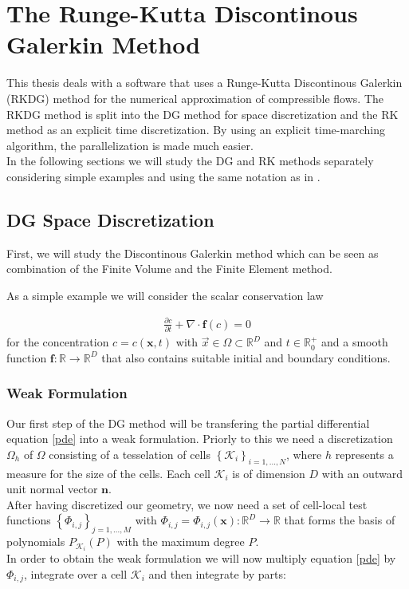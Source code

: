 \chapter{The Runge-Kutta Discontinous Galerkin Method}
\label{rkdgm}
	This thesis deals with a software that uses a Runge-Kutta Discontinous Galerkin (RKDG) method for the numerical approximation of compressible flows. The RKDG method is split into the DG method for space discretization and the RK method as an explicit time discretization. By using an explicit time-marching algorithm, the parallelization is made much easier. \\ \indent
	In the following sections we will study the DG and RK methods separately considering simple examples and using the same notation as in \cite{mueller2014}.
	\section{DG Space Discretization}
		First, we will study the Discontinous Galerkin method which can be seen as combination of the Finite Volume and the Finite Element method.

		As a simple example we will consider the scalar conservation law 
		
		\begin{align}
			\frac{\partial c}{\partial t} + \nabla \cdot \boldsymbol{f}(c) = 0
			\label{pde}
		\end{align}	
		for the concentration $c = c(\boldsymbol{x}, t)$  with $\vec{x} \in \Omega \subset \mathbb{R}^D$ and $t\in \mathbb{R}_0^+$ and a smooth function $\boldsymbol{f}:\mathbb{R} \rightarrow \mathbb{R}^D$ that also contains suitable initial and boundary conditions.\cite{mueller2014} 
		\subsection{Weak Formulation}
		Our first step of the DG method will be transfering the partial differential equation \eqref{pde} into a weak formulation.
		Priorly to this we need a discretization $\Omega_h$ of $\Omega$ consisting of a tesselation of cells $\left\{ \mathcal{K}_i \right\}_{i=1,...,N}$, where $h$ represents a measure for the size of the cells. Each cell $\mathcal{K}_i$ is of dimension $D$ with an outward unit normal vector $\boldsymbol{n}$. \\ \indent 
		After having discretized our geometry, we now need a set of cell-local test functions $\left\{\Phi_{i,j}\right\}_{j=1,...,M} $ with $\Phi_{i,j}=\Phi_{i,j}(\boldsymbol{x}):\mathbb{R}^D\rightarrow\mathbb{R}$ that forms the basis of polynomials $P_{\mathcal{K}_i}(P)$ with the maximum degree $P$. \\ \indent
		In order to obtain the weak formulation we will now multiply equation \eqref{pde} by $\Phi_{i,j}$, integrate over a cell $\mathcal{K}_i$ and then integrate by parts:
		
